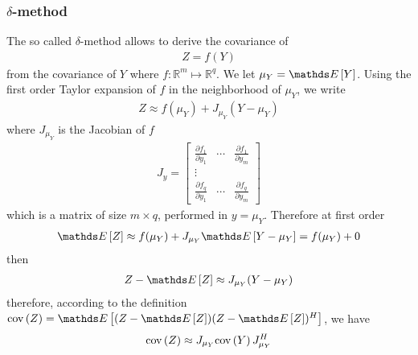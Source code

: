 \subsubsection{$\delta$-method}

The so called $\delta$-method allows to derive the covariance of 
\begin{eqnarray*}
 Z = f(Y)
\end{eqnarray*}
from the covariance of $Y$ where $f:\mathds{R}^{m}\mapsto \mathds{R}^{q}$. 
We let $\mu_{Y}=\esp{Y}$. Using the first order Taylor expansion of $f$ in the neighborhood  of $\mu_{Y}$, we write
\begin{eqnarray*}
Z \approx f(\mu_{Y}) + J_{\mu_{Y}}(Y-\mu_{Y})
\end{eqnarray*}
where $J_{\mu_{Y}}$ is the Jacobian of $f$
\begin{eqnarray*}
 J_{y}=\begin{bmatrix}
 \frac{\partial f_{1}}{\partial y_{1}}
 &\cdots
 & \frac{\partial f_{1}}{\partial y_{m}}
 \\
 \vdots
 \\
  \frac{\partial f_{q}}{\partial y_{1}}
 &\cdots
 & \frac{\partial f_{q}}{\partial y_{m}}
 \end{bmatrix}
\end{eqnarray*}
which is a matrix of size $m\times q$, performed in $y=\mu_{Y}$.
Therefore at first order
\begin{eqnarray*}
 \esp{Z} \approx f(\mu_{Y}) + J_{\mu_{Y}}\esp{Y-\mu_{Y}}=f(\mu_{Y})+0
\end{eqnarray*}
then
\begin{eqnarray*}
 Z-\esp{Z}\approx J_{\mu_{Y}}(Y-\mu_{Y})
\end{eqnarray*}
therefore, according to the definition $\cov{Z} = \esp{(Z-\esp{Z})(Z-\esp{Z})^{H}}$, we have
\begin{eqnarray*}
 \mathrm{cov}\left( Z \right) \approx 
 J_{\mu_{Y}}\mathrm{cov}\left( Y \right)J_{\mu_{Y}}^{H}
\end{eqnarray*}

